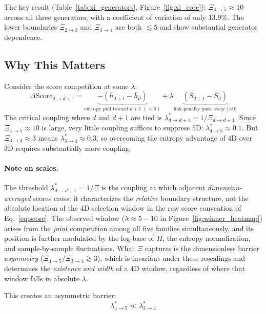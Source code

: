 \documentclass[12pt,a4paper]{article}
\begin{document}
The key result (Table~\ref{tab:xi_generators}, Figure~\ref{fig:xi_core}): $\Xi_{4 \to 5} \approx 10$ across all three generators,
with a coefficient of variation of only $13.9\%$. The lower boundaries
$\Xi_{2 \to 3}$ and $\Xi_{3 \to 4}$ are both $\lesssim 5$ and show substantial
generator dependence.

\subsection{Why This Matters}
\label{sec:xi_physics}

Consider the score competition at some $\lambda$:
\begin{equation}
\Delta\mathrm{Score}_{d \to d+1}
  = \underbrace{-(\overline{h}_{d+1} - \overline{h}_d)}_{\text{entropy pull toward } d{+}1 \;(<0)}
  + \lambda \underbrace{(\overline{S}_{d+1} - \overline{S}_d)}_{\text{link-penalty push away (>0)}}
\label{eq:score_competition}
\end{equation}
The critical coupling where $d$ and $d{+}1$ are tied is
$\lambda^*_{d \to d+1} = 1 / \Xi_{d \to d+1}$.
Since $\Xi_{4 \to 5} \approx 10$ is large, very little coupling suffices to suppress 5D:
$\lambda^*_{4 \to 5} \approx 0.1$.
But $\Xi_{3 \to 4} \approx 3$ means $\lambda^*_{3 \to 4} \approx 0.3$,
so overcoming the entropy advantage of 4D over 3D requires substantially more coupling.

\paragraph{Note on scales.}
The threshold $\lambda^*_{d \to d+1} = 1/\Xi$ is the coupling at which
adjacent \emph{dimension-averaged} scores cross; it characterizes the
\emph{relative} boundary structure, not the absolute location of the 4D
selection window in the raw score convention of Eq.~\eqref{eq:score}.
The observed window ($\lambda \approx 5{-}10$ in Figure~\ref{fig:winner_heatmap})
arises from the \emph{joint} competition among all five families simultaneously,
and its position is further modulated by the log-base of $H$, the entropy
normalization, and sample-by-sample fluctuations.
What $\Xi$ captures is the dimensionless barrier \emph{asymmetry}
($\Xi_{4{\to}5} / \Xi_{3{\to}4} \gtrsim 3$), which is invariant
under these rescalings and determines the \emph{existence and width} of a
4D window, regardless of where that window falls in absolute $\lambda$.

This creates an asymmetric barrier:
\begin{equation}
\lambda^*_{4 \to 5} \ll \lambda^*_{3 \to 4}
\label{eq:asymmetric_barrier}
\end{equation}
\end{document}
